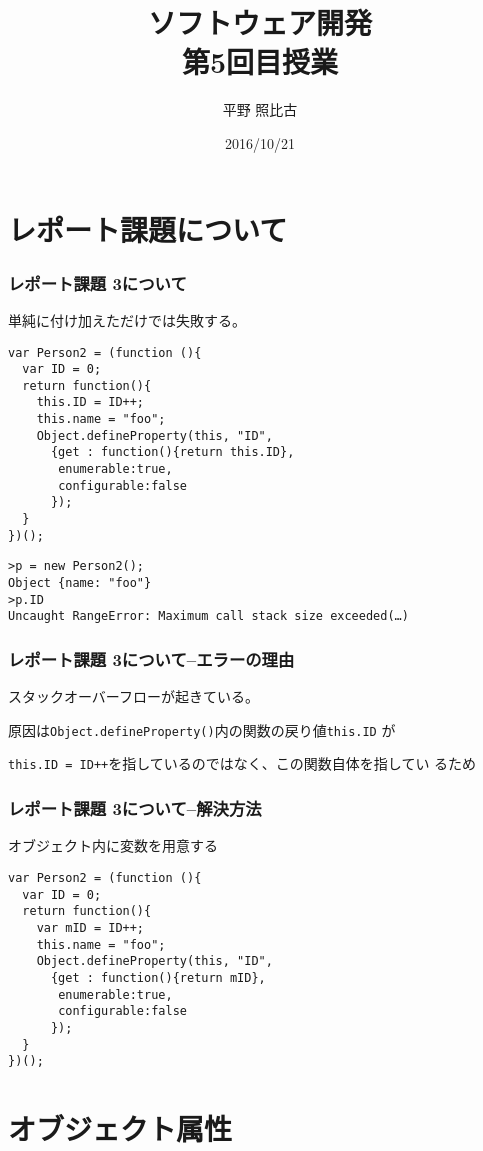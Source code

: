 
%
\title{ソフトウェア開発\\第5回目授業}
\author{平野 照比古}
\institute{}
\date{2016/10/21}

\frame{\maketitle}
\section{レポート課題について}
\begin{frame}[containsverbatim]
 \frametitle{レポート課題 3について}
 単純に付け加えただけでは失敗する。
 {\small
\begin{verbatim}
var Person2 = (function (){
  var ID = 0;
  return function(){
    this.ID = ID++;
    this.name = "foo";
    Object.defineProperty(this, "ID",
      {get : function(){return this.ID},
       enumerable:true,
       configurable:false
      });
  }
})();
\end{verbatim}
 
\begin{Verbatim}
>p = new Person2();
Object {name: "foo"}
>p.ID
Uncaught RangeError: Maximum call stack size exceeded(…)
\end{Verbatim}
 }
 \end{frame} 
\begin{frame}[containsVerbatim]
 \frametitle{レポート課題 3について--エラーの理由}
 スタックオーバーフローが起きている。

 原因は\texttt{Object.defineProperty()}内の関数の戻り値\texttt{this.ID}
 が

 \texttt{this.ID = ID++}を指しているのではなく、この関数自体を指してい
 るため
\end{frame}
\begin{frame}[containsVerbatim]
 \frametitle{レポート課題 3について--解決方法}
 オブジェクト内に変数を用意する
\begin{Verbatim}
var Person2 = (function (){
  var ID = 0;
  return function(){
    var mID = ID++;
    this.name = "foo";
    Object.defineProperty(this, "ID",
      {get : function(){return mID},
       enumerable:true,
       configurable:false
      });
  }
})();
\end{Verbatim}
\end{frame}
\newcommand{\ElmJ}[1]{\texttt{#1}}
\section{オブジェクト属性}

